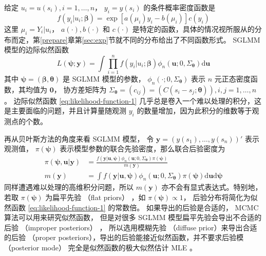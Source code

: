 \documentclass[12pt,a4paper,UTF8,twoside]{book}
\theoremstyle{definition}
\theoremstyle{definition}
\theoremstyle{definition}
\theoremstyle{remark}
\begin{document}
给定 \(u_i = u(s_i), i = 1, \ldots, n\)， \(y_i = y(s_i)\)
的条件概率密度函数是
\[f(y_i|u_i;\boldsymbol{\beta}) = \exp[a(\mu_i)y_i - b(\mu_i)]c(y_i)\]
这里 \(\mu_i = Y_i|u_i\)， \(a(\cdot),b(\cdot)\) 和 \(c(\cdot)\)
是特定的函数，具体的情况视所服从的分布而定，第\ref{prepare}章第\ref{sec:exp}节就不同的分布给出了不同函数形式。
SGLMM 模型的边际似然函数 \begin{equation}
L(\boldsymbol{\psi};\mathbf{y}) = \int \prod_{i=1}^{n} f(y_i|u_i;\boldsymbol{\beta})\phi_{n}(\mathbf{u};0,\Sigma_{\boldsymbol{\theta}})\mathrm{d}\mathbf{u} \label{eq:likelihood-function-1}
\end{equation} \noindent 其中
\(\boldsymbol{\psi} = (\boldsymbol{\beta},\boldsymbol{\theta})\) 是
SGLMM 模型的参数， \(\phi_{n}(\cdot;0,\Sigma_{\boldsymbol{\theta}})\)
表示 \(n\) 元正态密度函数，其均值为 \(\mathbf{0}\)， 协方差矩阵为
\(\Sigma_{\boldsymbol{\theta}} = (c_{ij}) = (C(s_i - s_j; \boldsymbol{\theta})), i,j = 1, \ldots, n\)。
边际似然函数 \eqref{eq:likelihood-function-1}
几乎总是卷入一个难以处理的积分，这是主要面临的问题，并且计算量随观测
\(y_i\) 的数量增加，因为此积分的维数等于观测点的个数\citep{Diggle2007}。

再从贝叶斯方法的角度来看 SGLMM 模型， 令
\(\mathbf{y} = (y(s_1),\ldots,y(s_n))'\) 表示观测值，
\(\pi(\boldsymbol{\psi})\)
表示模型参数的联合先验密度，那么联合后验密度为 \begin{equation}
\begin{aligned}
\pi(\boldsymbol{\psi},\mathbf{u}|\mathbf{y}) &= \frac{f(\mathbf{y|\mathbf{u}, \boldsymbol{\psi}})\phi_{n}(\mathbf{u};0,\Sigma_{\boldsymbol{\theta}})\pi(\boldsymbol{\psi})}{m(\mathbf{y})} \\
m(\mathbf{y}) &= \int f(\mathbf{y|\mathbf{u}, \boldsymbol{\psi}})\phi_{n}(\mathbf{u};0,\Sigma_{\boldsymbol{\theta}})\pi(\boldsymbol{\psi})\mathrm{d} \mathbf{u} \mathrm{d} \boldsymbol{\psi}
\end{aligned}
\end{equation} \noindent 同样遭遇难以处理的高维积分问题，所以
\(m(\mathbf{y})\) 亦不会有显式表达式。特别地，若取
\(\pi(\boldsymbol{\psi})\) 为扁平先验 （flat priors） ，如
\(\pi(\boldsymbol{\psi}) \propto 1\)， 后验分布将简化为似然函数
\eqref{eq:likelihood-function-1} 的常数倍。 如果导出的后验是合适的， MCMC
算法可以用来研究似然函数， 但是对很多 SGLMM
模型扁平先验会导出不合适的后验 （improper posteriors）
\citep{Natarajan1995}， 所以选用模糊先验 （diffuse
prior）来导出合适的后验 （proper
posteriors），导出的后验能接近似然函数，并不要求后验模 （posterior
mode） 完全是似然函数的极大似然估计 MLE \citep{Robert1996JASA}。
\end{document}
